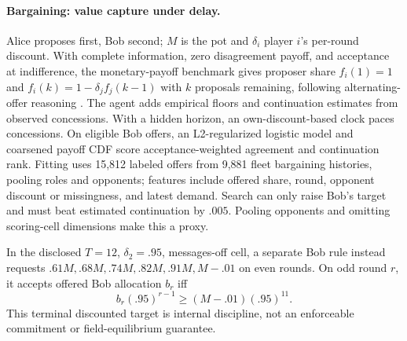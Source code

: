 \documentclass{article}
\begin{document}
\paragraph{Bargaining: value capture under delay.}
Alice proposes first, Bob second; $M$ is the pot and $\delta_i$ player $i$'s
per-round discount. With complete information, zero disagreement payoff, and
acceptance at indifference, the monetary-payoff benchmark gives proposer share
$f_i(1)=1$ and $f_i(k)=1-\delta_jf_j(k-1)$ with $k$ proposals remaining,
following alternating-offer reasoning \citep{rubinstein1982}. The agent adds
empirical floors and continuation estimates from observed concessions.
With a hidden horizon, an own-discount-based clock paces concessions.
On eligible Bob offers, an L2-regularized logistic model and coarsened payoff
CDF score acceptance-weighted agreement and continuation rank. Fitting uses
15,812 labeled offers from 9,881 fleet bargaining histories, pooling roles
and opponents; features include offered share, round, opponent discount or
missingness, and latest demand. Search can only raise Bob's target and must
beat estimated continuation by $.005$. Pooling opponents and omitting
scoring-cell dimensions make this a proxy.

In the disclosed $T=12$, $\delta_2=.95$, messages-off cell, a separate Bob
rule instead requests $.61M,.68M,.74M,.82M,.91M,M-.01$ on even rounds. On odd
round $r$, it accepts offered Bob allocation $b_r$ iff
\begin{equation}
b_r(.95)^{r-1}\geq(M-.01)(.95)^{11}.
\label{eq:bargaining-floor}
\end{equation}
This terminal discounted target is internal discipline, not an enforceable
commitment or field-equilibrium guarantee.
\end{document}
